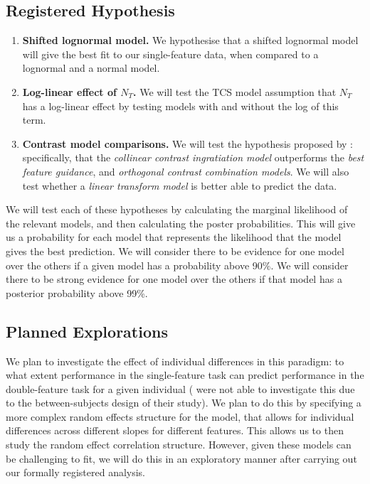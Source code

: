 \documentclass[preprint,12pt,authoryear]{elsarticle}
\begin{document}
\subsection{Registered Hypothesis}

\begin{enumerate}
\item \textbf{Shifted lognormal model.} We hypothesise that a shifted lognormal model will give the best fit to our single-feature data, when compared to a lognormal and a normal model. \\
\item \textbf{Log-linear effect of $N_T$.} We will test the TCS model assumption that $N_T$ has a log-linear effect by testing models with and without the log of this term.\\ 
\item \textbf{Contrast model comparisons.} We will test the hypothesis proposed by \citep{buetti2019predicting}: specifically, that the \textit{collinear contrast ingratiation model} outperforms the \textit{best feature guidance}, and \textit{orthogonal contrast combination models}. We will also test whether a \textit{linear transform model} is better able to predict the data. \\
\end{enumerate}

We will test each of these hypotheses by calculating the marginal likelihood of the relevant models, and then calculating the poster probabilities. This will give us a probability for each model that represents the likelihood that the model gives the best prediction. We will consider there to be evidence for one model over the others if a given model has a probability above 90\%. We will consider there to be strong evidence for one model over the others if that model has a posterior probability above 99\%.

\subsection{Planned Explorations}

We plan to investigate the effect of individual differences in this paradigm: to what extent performance in the single-feature task can predict performance in the double-feature task for a given individual (\cite{buetti2019predicting} were not able to investigate this due to the between-subjects design of their study). We plan to do this by specifying a more complex random effects structure for the model, that allows for individual differences across different slopes for different features. This allows us to then study the random effect correlation structure.  However, given these models can be challenging to fit, we will do this in an exploratory manner after carrying out our formally registered analysis.
\end{document}
